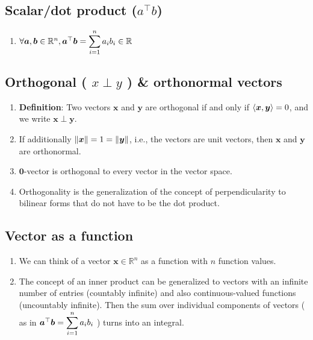 \subsection{Scalar/dot product ($a^\top b$)}


\begin{enumerate}
    \item $
        \forall \bm{a}, \bm{b} \in \mathbb{R}^n, 
        \bm{a}^\top \bm{b} = \displaystyle\sum^n_{i=1} a_i b_i \in \mathbb{R}    
    $
    \hfill \cite{mfml/book/mml/Deisenroth-Faisal-Ong}
    
\end{enumerate}



\subsection{Orthogonal ( $x \perp y$ ) \& orthonormal vectors}

\begin{enumerate}
    \item \textbf{Definition}: Two vectors $\bm{x}$ and $\bm{y}$ are orthogonal if and only if $\langle\bm{x}, \bm{y}\rangle = 0$, and we write $\bm{x} \perp \bm{y}$. 
    \hfill \cite{mfml/book/mml/Deisenroth-Faisal-Ong}
    
    \item If additionally $\left\| \bm{x} \right\| = 1 = \left\| \bm{y} \right\|$, i.e., the vectors are unit vectors, then $\bm{x}$ and $\bm{y}$ are orthonormal.
    \hfill \cite{mfml/book/mml/Deisenroth-Faisal-Ong}

    \item $\bm{0}$-vector is orthogonal to every vector in the vector space.
    \hfill \cite{mfml/book/mml/Deisenroth-Faisal-Ong}

    \item Orthogonality is the generalization of the concept of perpendicularity to bilinear forms that do not have to be the dot product.
    \hfill \cite{mfml/book/mml/Deisenroth-Faisal-Ong}
\end{enumerate}




\subsection{Vector as a function}


\begin{enumerate}
    \item We can think of a vector $\bm{x} \in \mathbb{R}^n$ as a function with $n$ function values.
    \hfill \cite{mfml/book/mml/Deisenroth-Faisal-Ong}

    \item The concept of an inner product can be generalized to vectors with an infinite number of entries (countably infinite) and also continuous-valued functions (uncountably infinite).
    Then the sum over individual components of vectors ( as in $\bm{a}^\top \bm{b} = \displaystyle\sum^n_{i=1} a_i b_i$ ) turns into an integral.
    \hfill \cite{mfml/book/mml/Deisenroth-Faisal-Ong}

    
\end{enumerate}




